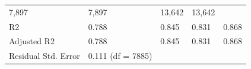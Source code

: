 \documentclass[]{book}
\begin{document}
\begin{longtable}[]{@{}lllll@{}}
\begin{minipage}[t]{0.17\columnwidth}
7,897\strut
\end{minipage} & \begin{minipage}[t]{0.17\columnwidth}\raggedright\strut
7,897\strut
\end{minipage} & \begin{minipage}[t]{0.18\columnwidth}\raggedright\strut
13,642\strut
\end{minipage} & \begin{minipage}[t]{0.18\columnwidth}\raggedright\strut
13,642\strut
\end{minipage}\tabularnewline
\begin{minipage}[t]{0.15\columnwidth}\raggedright\strut
R2\strut
\end{minipage} & \begin{minipage}[t]{0.17\columnwidth}\raggedright\strut
0.788\strut
\end{minipage} & \begin{minipage}[t]{0.17\columnwidth}\raggedright\strut
0.845\strut
\end{minipage} & \begin{minipage}[t]{0.18\columnwidth}\raggedright\strut
0.831\strut
\end{minipage} & \begin{minipage}[t]{0.18\columnwidth}\raggedright\strut
0.868\strut
\end{minipage}\tabularnewline
\begin{minipage}[t]{0.15\columnwidth}\raggedright\strut
Adjusted R2\strut
\end{minipage} & \begin{minipage}[t]{0.17\columnwidth}\raggedright\strut
0.788\strut
\end{minipage} & \begin{minipage}[t]{0.17\columnwidth}\raggedright\strut
0.845\strut
\end{minipage} & \begin{minipage}[t]{0.18\columnwidth}\raggedright\strut
0.831\strut
\end{minipage} & \begin{minipage}[t]{0.18\columnwidth}\raggedright\strut
0.868\strut
\end{minipage}\tabularnewline
\begin{minipage}[t]{0.15\columnwidth}\raggedright\strut
Residual Std. Error\strut
\end{minipage} & \begin{minipage}[t]{0.17\columnwidth}\raggedright\strut
0.111 (df = 7885)\strut
\end{minipage} & \begin{minipage}[t]{0.17\columnwidth}\raggedright\strut

\end{minipage}
\end{longtable}
\end{document}
